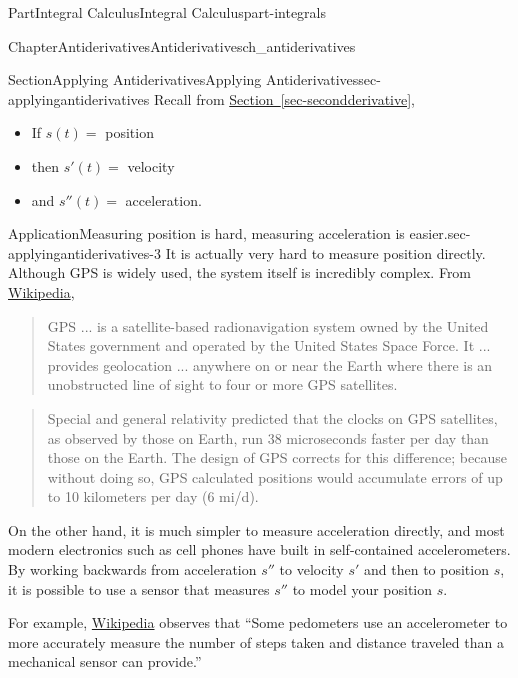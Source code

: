\documentclass{tufte-book}
\newcommand{\xreffont}{\relax}
\numberwithin{equation}{chapter}
\begin{document}
\begin{partptx}{Part}{Integral Calculus}{}{Integral Calculus}{}{}{part-integrals}
\begin{chapterptx}{Chapter}{Antiderivatives}{}{Antiderivatives}{}{}{ch_antiderivatives}
%
\begin{sectionptx}{Section}{Applying Antiderivatives}{}{Applying Antiderivatives}{}{}{sec-applyingantiderivatives}
Recall from \hyperref[sec-secondderivative]{Section~{\xreffont\ref{sec-secondderivative}}},%
\begin{itemize}[label=\textbullet]
\item{}If \(s(t) = \) position%
\item{}then \(s'(t) = \) velocity%
\item{}and \(s''(t) = \) acceleration.%
\end{itemize}
%
\begin{insight}{Application}{Measuring position is hard, measuring acceleration is easier.}{sec-applyingantiderivatives-3}%
It is actually very hard to measure position directly.  Although GPS is widely used, the system itself is incredibly complex.  From \href{https://en.wikipedia.org/wiki/Global_Positioning_System}{Wikipedia}\footnotemark{},%
\begin{quote}%
GPS ... is a satellite-based radionavigation system owned by the United States government and operated by the United States Space Force. It ... provides geolocation ... anywhere on or near the Earth where there is an unobstructed line of sight to four or more GPS satellites.%
\end{quote}
\begin{quote}%
Special and general relativity predicted that the clocks on GPS satellites, as observed by those on Earth, run 38 microseconds faster per day than those on the Earth. The design of GPS corrects for this difference; because without doing so, GPS calculated positions would accumulate errors of up to 10 kilometers per day (6 mi\slash{}d).%
\end{quote}
On the other hand, it is much simpler to measure acceleration directly, and most modern electronics such as cell phones have built in self-contained accelerometers. By working backwards from acceleration \(s''\) to velocity \(s'\) and then to position \(s\), it is possible to use a sensor that measures \(s''\) to model your position \(s\).%
\par
For example, \href{https://en.wikipedia.org/wiki/Accelerometer\#Consumer_electronics}{Wikipedia}\footnotemark{} observes that ``Some pedometers use an accelerometer to more accurately measure the number of steps taken and distance traveled than a mechanical sensor can provide.''%
\end{insight}
%

\end{sectionptx}
\end{chapterptx}
\end{partptx}
\end{document}
